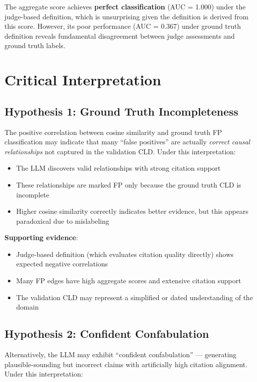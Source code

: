 The aggregate score achieves \textbf{perfect classification} (AUC = 1.000) under the judge-based definition, which is unsurprising given the definition is derived from this score. However, its poor performance (AUC = 0.367) under ground truth definition reveals fundamental disagreement between judge assessments and ground truth labels.

\section{Critical Interpretation}

\subsection{Hypothesis 1: Ground Truth Incompleteness}

The positive correlation between cosine similarity and ground truth FP classification may indicate that many ``false positives'' are actually \textit{correct causal relationships} not captured in the validation CLD. Under this interpretation:

\begin{itemize}
    \item The LLM discovers valid relationships with strong citation support
    \item These relationships are marked FP only because the ground truth CLD is incomplete
    \item Higher cosine similarity correctly indicates better evidence, but this appears paradoxical due to mislabeling
\end{itemize}

\textbf{Supporting evidence}:
\begin{itemize}
    \item Judge-based definition (which evaluates citation quality directly) shows expected negative correlations
    \item Many FP edges have high aggregate scores and extensive citation support
    \item The validation CLD may represent a simplified or dated understanding of the domain
\end{itemize}

\subsection{Hypothesis 2: Confident Confabulation}

Alternatively, the LLM may exhibit ``confident confabulation'' --- generating plausible-sounding but incorrect claims with artificially high citation alignment. Under this interpretation:


